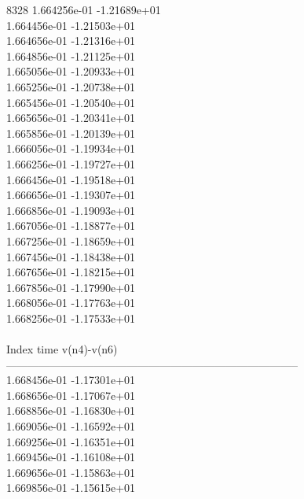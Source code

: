 8328	1.664256e-01	-1.21689e+01	\\ 	1.664456e-01	-1.21503e+01	\\ 	1.664656e-01	-1.21316e+01	\\ 	1.664856e-01	-1.21125e+01	\\ 	1.665056e-01	-1.20933e+01	\\ 	1.665256e-01	-1.20738e+01	\\ 	1.665456e-01	-1.20540e+01	\\ 	1.665656e-01	-1.20341e+01	\\ 	1.665856e-01	-1.20139e+01	\\ 	1.666056e-01	-1.19934e+01	\\ 	1.666256e-01	-1.19727e+01	\\ 	1.666456e-01	-1.19518e+01	\\ 	1.666656e-01	-1.19307e+01	\\ 	1.666856e-01	-1.19093e+01	\\ 	1.667056e-01	-1.18877e+01	\\ 	1.667256e-01	-1.18659e+01	\\ 	1.667456e-01	-1.18438e+01	\\ 	1.667656e-01	-1.18215e+01	\\ 	1.667856e-01	-1.17990e+01	\\ 	1.668056e-01	-1.17763e+01	\\ 	1.668256e-01	-1.17533e+01	\\ \hline
\\ \hline
Index   time            v(n4)-v(n6)     \\ \hline
--------------------------------------------------------------------------------\\ 	1.668456e-01	-1.17301e+01	\\ 	1.668656e-01	-1.17067e+01	\\ 	1.668856e-01	-1.16830e+01	\\ 	1.669056e-01	-1.16592e+01	\\ 	1.669256e-01	-1.16351e+01	\\ 	1.669456e-01	-1.16108e+01	\\ 	1.669656e-01	-1.15863e+01	\\ 	1.669856e-01	-1.15615e+01	\\ \hline
